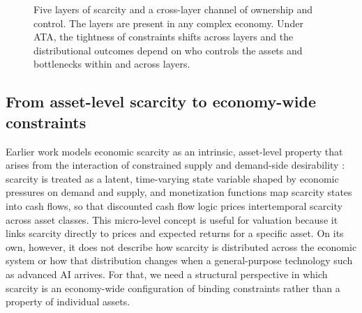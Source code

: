 \documentclass[11pt]{article}
\begin{document}
\begin{figure}[t]
\centering
{}
\caption{Five layers of scarcity and a cross-layer channel of ownership and control. The layers are present
in any complex economy. Under ATA, the tightness of constraints shifts across layers and the distributional
outcomes depend on who controls the assets and bottlenecks within and across layers.}
\label{fig:ai_scarcity_stack}
\end{figure}

\subsection{From asset-level scarcity to economy-wide constraints}

Earlier work models economic scarcity as an intrinsic, asset-level property that arises from the interaction of constrained supply and demand-side desirability \citep{PapadogiannisScarcity2025}: scarcity is treated as a latent, time-varying state variable shaped by economic pressures on demand and supply, and monetization functions map scarcity states into cash flows, so that discounted cash flow logic prices intertemporal scarcity across asset classes. This micro-level concept is useful for valuation because it links scarcity directly to prices and expected returns for a specific asset. On its own, however, it does not describe how scarcity is distributed across the economic system or how that distribution changes when a general-purpose technology such as advanced AI arrives. For that, we need a structural perspective in which scarcity is an economy-wide configuration of binding constraints rather than a property of individual assets.
\end{document}
